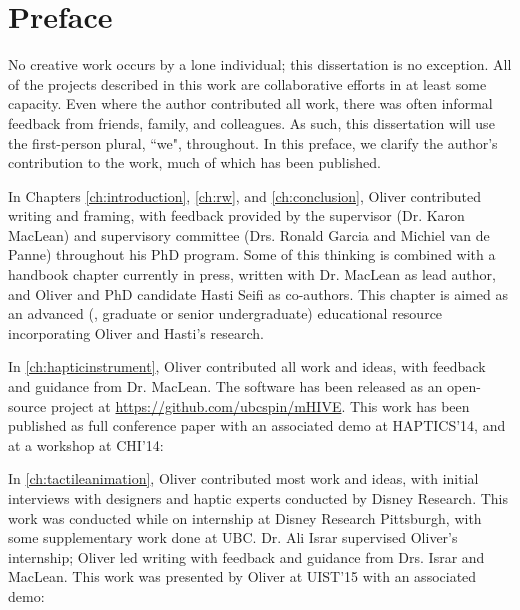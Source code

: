 
\chapter{Preface}
No creative work occurs by a lone individual; this dissertation is no exception.
All of the projects described in this work are collaborative efforts in at least some capacity.
Even where the author contributed all work, there was often informal feedback from friends, family, and colleagues.
As such, this dissertation will use the first-person plural, ``we", throughout.
In this preface, we clarify the author's contribution to the work, much of which has been published.

In Chapters \ref{ch:introduction}, \ref{ch:rw}, and \ref{ch:conclusion}, Oliver contributed writing and framing, with feedback provided by the supervisor (Dr. Karon MacLean) and supervisory committee (Drs. Ronald Garcia and Michiel van de Panne) throughout his PhD program. 
Some of this thinking  is combined with a handbook chapter currently in press, written with Dr. MacLean as lead author, and Oliver and PhD candidate Hasti Seifi as co-authors.
This chapter is aimed as an advanced (\ie, graduate or senior undergraduate) educational resource incorporating Oliver and Hasti's research.

In \autoref{ch:hapticinstrument}, Oliver contributed all work and ideas, with feedback and guidance from Dr. MacLean.
The software has been released as an open-source project at \url{https://github.com/ubcspin/mHIVE}.
This work has been published as full conference paper with an associated demo at HAPTICS'14, and at a workshop at CHI'14:


\noindent
In \autoref{ch:tactileanimation}, Oliver contributed most work and ideas, with initial interviews with designers and haptic experts conducted by Disney Research.
This work was conducted while on internship at Disney Research Pittsburgh, with some supplementary work done at UBC.
Dr. Ali Israr supervised Oliver's internship; Oliver led writing with feedback and guidance from Drs. Israr and MacLean.
This work was presented by Oliver at UIST'15 with an associated demo:

